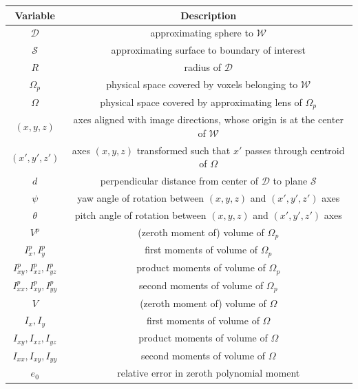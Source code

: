 \begin{linenomath}\begin{table}[t!]
 \centering
   \begin{tabular}{|c||c|}
   \hline
   {\textbf{Variable}} & {\textbf{Description}} \\ \hline \hline
   $\mathcal{D}$ & approximating sphere to $\mathcal{W}$ \\ \hline
   $\mathcal{S}$ & approximating surface to boundary of interest \\ \hline      
   $R$ & radius of $\mathcal{D}$ \\ \hline   
   $\Omega_p$ & physical space covered by voxels belonging to $\mathcal{W}$ \\ \hline
   $\Omega$ & physical space covered by approximating lens of $\Omega_p$ \\ \hline      
   $(x,y,z)$ & axes aligned with image directions, whose origin is at the center of $\mathcal{W}$\\ \hline
   {$(x',y',z')$} & axes $(x,y,z)$ transformed such that $x'$ passes through centroid of $\Omega$ \\ \hline
   $d$ & perpendicular distance from center of $\mathcal{D}$ to plane $\mathcal{S}$  \\ \hline
   $\psi$ & yaw angle of rotation between $(x,y,z)$ and $(x',y',z')$ axes \\ \hline   
   $\theta$ & pitch angle of rotation between $(x,y,z)$ and $(x',y',z')$ axes \\ \hline
   $V^p$ & (zeroth moment of) volume of $\Omega_p$ \\ \hline
   $I_{x}^p, I_y^p$ & first moments of volume of $\Omega_p$ \\ \hline     
   $I_{xy}^p, I_{xz}^p, I_{yz}^p$ & product moments of volume of $\Omega_p$ \\ \hline      
   $I_{xx}^p, I_{xy}^p, I_{yy}^p$ & second moments of volume of $\Omega_p$ \\ \hline
   $V$ & (zeroth moment of) volume of $\Omega$ \\ \hline
   $I_{x}, I_y$ & first moments of volume of $\Omega$ \\ \hline
   $I_{xy}, I_{xz}, I_{yz}$ & product moments of volume of $\Omega$ \\ \hline   
   $I_{xx}, I_{xy}, I_{yy}$ & second moments of volume of $\Omega$ \\ \hline
   $e_0$ & relative error in zeroth polynomial moment \\ \hline

\end{tabular}
\end{table}
\end{linenomath}
